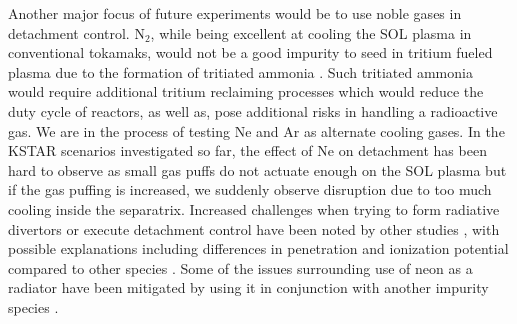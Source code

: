 Another major focus of future experiments would be to use noble gases in detachment control.
N$_2$, while being excellent at cooling the SOL plasma in conventional tokamaks, would not be a good impurity to seed in tritium fueled plasma due to the formation of tritiated ammonia \cite{Pitts_2019_NME}.
Such tritiated ammonia would require additional tritium reclaiming processes which would reduce the duty cycle of reactors, as well as, pose additional risks in handling a radioactive gas.
We are in the process of testing Ne and Ar as alternate cooling gases.
In the KSTAR scenarios investigated so far, the effect of Ne on detachment has been hard to observe as small gas puffs do not actuate enough on the \ac{SOL} plasma but if the gas puffing is increased, we suddenly observe disruption due to too much cooling inside the separatrix.
Increased challenges when trying to form radiative divertors or execute detachment control have been noted by other studies \cite{eldon_2025_ppcf}, with possible explanations including differences in penetration and ionization potential compared to other species \cite{casali_2020_pop,casali_2022_nf}.
Some of the issues surrounding use of neon as a radiator have been mitigated by using it in conjunction with another impurity species \cite{Eldon_2023_NME}.
